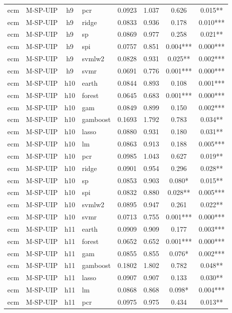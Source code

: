 \begin{ThreePartTable}
\begin{longtable}[t]{llclcccc}
ecm & M-SP-UIP & h9 & pcr & 0.0923 & 1.037 & 0.626 & 0.015**\\
ecm & M-SP-UIP & h9 & ridge & 0.0833 & 0.936 & 0.178 & 0.010***\\
ecm & M-SP-UIP & h9 & sp & 0.0869 & 0.977 & 0.258 & 0.021**\\
ecm & M-SP-UIP & h9 & spi & 0.0757 & 0.851 & 0.004*** & 0.000***\\
ecm & M-SP-UIP & h9 & svmlw2 & 0.0828 & 0.931 & 0.025** & 0.002***\\
ecm & M-SP-UIP & h9 & svmr & 0.0691 & 0.776 & 0.001*** & 0.000***\\
\addlinespace
ecm & M-SP-UIP & h10 & earth & 0.0844 & 0.893 & 0.108 & 0.001***\\
ecm & M-SP-UIP & h10 & forest & 0.0645 & 0.683 & 0.001*** & 0.000***\\
ecm & M-SP-UIP & h10 & gam & 0.0849 & 0.899 & 0.150 & 0.002***\\
ecm & M-SP-UIP & h10 & gamboost & 0.1693 & 1.792 & 0.783 & 0.034**\\
ecm & M-SP-UIP & h10 & lasso & 0.0880 & 0.931 & 0.180 & 0.031**\\
ecm & M-SP-UIP & h10 & lm & 0.0863 & 0.913 & 0.188 & 0.005***\\
ecm & M-SP-UIP & h10 & pcr & 0.0985 & 1.043 & 0.627 & 0.019**\\
ecm & M-SP-UIP & h10 & ridge & 0.0901 & 0.954 & 0.296 & 0.028**\\
ecm & M-SP-UIP & h10 & sp & 0.0853 & 0.903 & 0.080* & 0.015**\\
ecm & M-SP-UIP & h10 & spi & 0.0832 & 0.880 & 0.028** & 0.005***\\
ecm & M-SP-UIP & h10 & svmlw2 & 0.0895 & 0.947 & 0.261 & 0.022**\\
ecm & M-SP-UIP & h10 & svmr & 0.0713 & 0.755 & 0.001*** & 0.000***\\
\addlinespace
ecm & M-SP-UIP & h11 & earth & 0.0909 & 0.909 & 0.177 & 0.003***\\
ecm & M-SP-UIP & h11 & forest & 0.0652 & 0.652 & 0.001*** & 0.000***\\
ecm & M-SP-UIP & h11 & gam & 0.0855 & 0.855 & 0.076* & 0.002***\\
ecm & M-SP-UIP & h11 & gamboost & 0.1802 & 1.802 & 0.782 & 0.048**\\
ecm & M-SP-UIP & h11 & lasso & 0.0907 & 0.907 & 0.133 & 0.030**\\
ecm & M-SP-UIP & h11 & lm & 0.0868 & 0.868 & 0.098* & 0.004***\\
ecm & M-SP-UIP & h11 & pcr & 0.0975 & 0.975 & 0.434 & 0.013**\\

\end{longtable}
\end{ThreePartTable}
